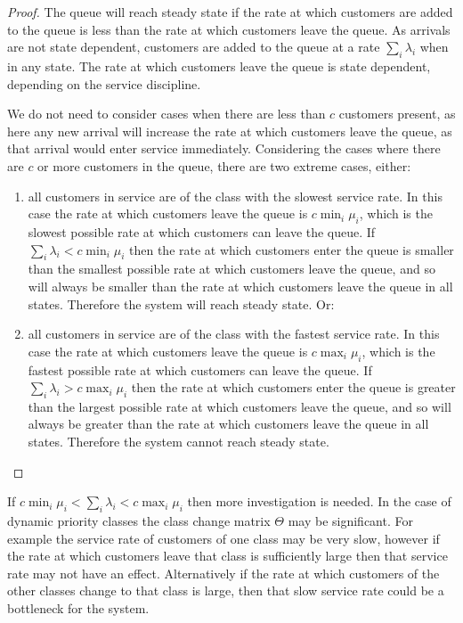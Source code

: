 \documentclass{article}
\begin{document}
\begin{proof}
The queue will reach steady state if the rate at which customers are added to
the queue is less than the rate at which customers leave the queue.
As arrivals are not state dependent, customers are added to the queue at a rate
$\sum_i \lambda_i$ when in any state.
The rate at which customers leave the queue is state dependent, depending on the
service discipline.

We do not need to consider cases when there are less than $c$ customers present,
as here any new arrival will increase the rate at which customers leave the
queue, as that arrival would enter service immediately.
Considering the cases where there are $c$ or more customers in the queue, there
are two extreme cases, either:

\begin{enumerate}
  \item all customers in service are of the class with the slowest service rate.
  In this case the rate at which customers leave the queue is $c \min_i \mu_i$,
  which is the slowest possible rate at which customers can leave the queue.
  If $\sum_i \lambda_i < c \min_i \mu_i$ then the rate at which customers enter
  the queue is smaller than the smallest possible rate at which customers leave
  the queue, and so will always be smaller than the rate at which customers
  leave the queue in all states. Therefore the system will reach steady state.
  Or:
  \item all customers in service are of the class with the fastest service rate.
  In this case the rate at which customers leave the queue is $c \max_i \mu_i$,
  which is the fastest possible rate at which customers can leave the queue.
  If $\sum_i \lambda_i > c \max_i \mu_i$ then the rate at which customers enter
  the queue is greater than the largest possible rate at which customers leave
  the queue, and so will always be greater than the rate at which customers
  leave the queue in all states. Therefore the system cannot reach steady state.
\end{enumerate}
\end{proof}

If $c \min_i \mu_i < \sum_i \lambda_i < c \max_i \mu_i$ then more investigation
is needed. In the case of dynamic priority classes the class change matrix
$\Theta$ may be significant. For example the service rate of customers of one
class may be very slow, however if the rate at which customers leave that class
is sufficiently large then that service rate may not have an effect.
Alternatively if the rate at which customers of the other classes change to that
class is large, then that slow service rate could be a bottleneck for the
system.
\end{document}
